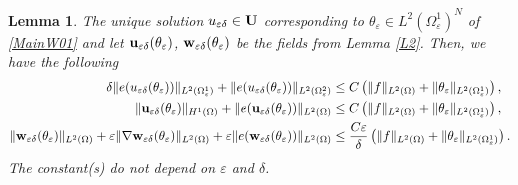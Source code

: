 \documentclass[11pt,a4paper]{article}
\numberwithin{equation}{section}
\def\clm{\color{magenta}}
\def\O{\Omega}
\def\d{\delta}
\def\e{\varepsilon}
\def\a{{\alpha}}
\def\ed{{\varepsilon\delta}}
\def\Gu{{\bf u}}
\def\Gw{{\bf w}}
\def\GU{{\bf U}}
\newtheorem{lemma}[theorem]{Lemma}
\newtheorem{remark}{Remark}
\begin{document}
		\begin{lemma}\label{L3}
			The unique solution $u_\ed\in\GU$ corresponding to $\theta_\e\in L^2(\O_\e^1)^N$ of \eqref{MainW01} and let $\Gu_\ed(\theta_\e)$, $\Gw_\ed(\theta_\e)$ be the fields from Lemma \ref{L2}. Then, we have the following
			\begin{equation}\label{E01}
				\begin{aligned}
					\d\|e(u_\ed(\theta_\e))\|_{L^2(\O^1_\e)}+\|e(u_\ed(\theta_\e))\|_{L^2(\O^2_\e)}&\leq C\left(\|f\|_{L^2(\O)}+\|\theta_\e\|_{L^2(\O^1_\e)}\right),\\
					\|\Gu_\ed(\theta_\e)\|_{H^1(\O)}+\|e(\Gu_\ed(\theta_\e))\|_{L^2(\O)}&\leq C\left(\|f\|_{L^2(\O)}+\|\theta_\e\|_{L^2(\O^1_\e)}\right),\\
					\|\Gw_\ed(\theta_\e)\|_{L^2(\O)}+\e\|\nabla \Gw_\ed(\theta_\e)\|_{L^2(\O)}+\e\|e(\Gw_\ed(\theta_\e))\|_{L^2(\O)}&\leq {C\e\over \d}\left(\|f\|_{L^2(\O)}+\|\theta_\e\|_{L^2(\O^1_\e)}\right).
				\end{aligned}
			\end{equation}
			The constant(s) do not depend on $\e$ and $\d$.
		\end{lemma}
\end{document}
